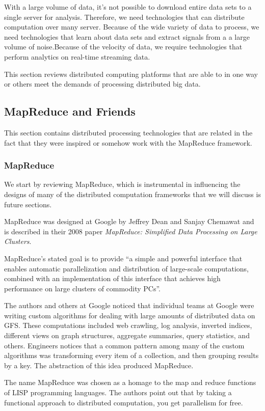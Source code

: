 \documentclass[]{article}
\begin{document}
With a large volume of data, it's not possible to download  entire data sets to a single server for analysis. Therefore, we need technologies that can distribute computation over many server. Because of the wide variety of data to process, we need technologies that learn about data sets and extract signals from a a large volume of noise.Because of the velocity of data, we require technologies that perform analytics on real-time streaming data.

This section reviews distributed computing platforms that are able to in one way or others meet the demands of processing distributed big data.

\subsection{MapReduce and Friends}
This section contains distributed processing technologies that are related in the fact that they were inspired or somehow work with the MapReduce framework.

\subsubsection{MapReduce}
We start by reviewing MapReduce, which is instrumental in influencing the designs of many of the distributed computation frameworks that we will discuss is future sections. 

MapReduce was designed at Google by Jeffrey Dean and Sanjay Chemawat and is described in their 2008 paper \textit{MapReduce: Simplified Data Processing on Large Clusters}\cite{dean2008mapreduce}.

MapReduce's stated goal is to provide ``a simple and powerful interface that enables automatic parallelization and distribution of large-scale computations, combined with an implementation of this interface that achieves high performance on large clusters of commodity PCs''. 

The authors and others at Google noticed that individual teams at Google were writing custom algorithms for dealing with large amounts of distributed data on GFS. These computations included web crawling, log analysis, inverted indices, different views on graph structures, aggregate summaries, query statistics, and others. Engineers notices that a common pattern among many of the custom algorithms was transforming every item of a collection, and then grouping results by a key. The abstraction of this idea produced MapReduce. 

The name MapReduce was chosen as a homage to the map and reduce functions of LISP programming languages. The authors point out that by taking a functional approach to distributed computation, you get parallelism for free.
\end{document}
